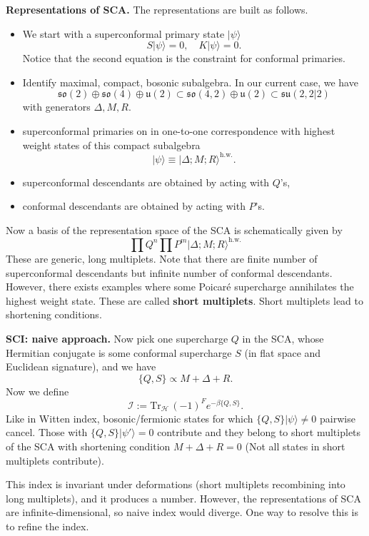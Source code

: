 \documentclass[a4paper,11pt]{article}
\begin{document}
\bigskip
\noindent\textbf{Representations of SCA.}
The representations are built as follows.
\begin{itemize}
    \item We start with a superconformal primary state $|\psi \rangle$
    $$
    S|\psi\rangle = 0, \quad K|\psi\rangle = 0.
    $$
    Notice that the second equation is the constraint for conformal primaries.
    \item Identify maximal, compact, bosonic subalgebra. In our current case, we have
    $$
    \mathfrak{so}(2) \oplus \mathfrak{so}(4) \oplus \mathfrak{u}(2) \subset \mathfrak{so}(4,2)
    \oplus \mathfrak{u}(2) \subset \mathfrak{su}(2,2|2)    
    $$
    with generators $\Delta, M, R$.
    \item superconformal primaries on in one-to-one correspondence with highest weight states of this compact subalgebra
    $$
    |\psi\rangle \equiv |\Delta; M; R\rangle^\mathrm{h.w.}.
    $$
    \item superconformal descendants are obtained by acting with $Q$'s,
    \item conformal descendants are obtained by acting with $P$'s.
\end{itemize}
Now a basis of the representation space of the SCA is schematically given by
$$
\prod Q^n \prod P^m |\Delta; M; R\rangle^\mathrm{h.w.}
$$
These are generic, long multiplets. Note that there are finite number of superconformal descendants but infinite number of conformal descendants. However, there exists examples where some Poicar\'{e} supercharge annihilates the highest weight state. These are called \textbf{short multiplets}. Short multiplets lead to shortening conditions.

\bigskip
\noindent\textbf{SCI: naive approach.}
Now pick one supercharge $Q$ in the SCA, whose Hermitian conjugate is some conformal supercharge $S$ (in flat space and Euclidean signature), and we have
$$
\{Q, S\} \propto M + \Delta + R.
$$
Now we define
\begin{equation}
    \mathcal{I}:= \mathrm{Tr}_\mathcal{H}\, (-1)^F e^{-\beta \{Q,S\}}.
\end{equation}
Like in Witten index, bosonic/fermionic states for which $\{Q, S\}|\psi\rangle \neq 0$ pairwise cancel. Those with $\{Q, S\}|\psi'\rangle = 0$ contribute and they belong to short multiplets of the SCA with shortening condition $M+ \Delta + R = 0$ (Not all states in short multiplets contribute).

This index is invariant under deformations (short multiplets recombining into long multiplets), and it produces a number.
However, the representations of SCA are infinite-dimensional, so naive index would diverge. One way to resolve this is to refine the index.
\end{document}
